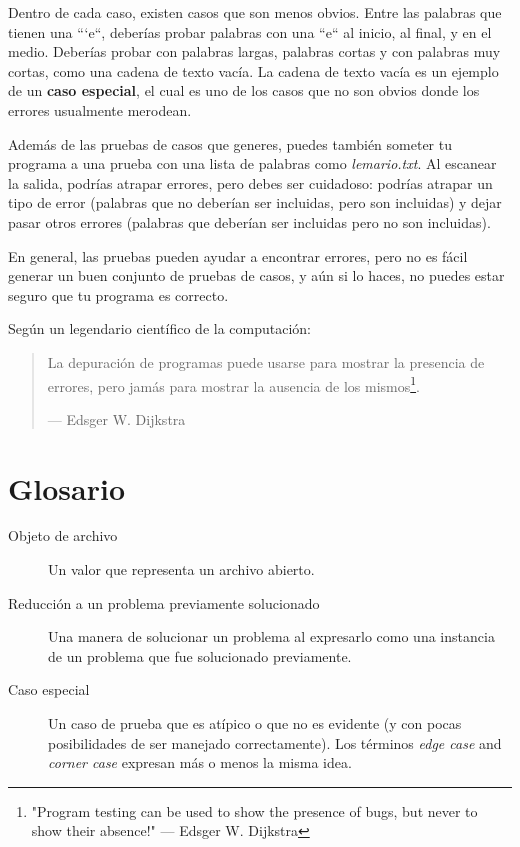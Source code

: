 Dentro de cada caso, existen casos que son menos obvios. Entre las palabras
que tienen una ```e``, deberías probar palabras con una ``e`` al inicio, 
al final, y en el medio. Deberías probar con palabras largas, palabras cortas
y con palabras muy cortas, como una cadena de texto vacía. La cadena de texto 
vacía es un ejemplo de un {\bf caso especial}, el cual es uno de los 
casos que no son obvios donde los errores usualmente merodean.

Además de las pruebas de casos que generes, puedes también someter
tu programa a una prueba con una lista de palabras como \emph{lemario.txt}.
Al escanear la salida, podrías atrapar errores, pero debes ser cuidadoso:
podrías atrapar un tipo de error (palabras que no deberían ser incluidas,
pero son incluidas) y dejar pasar otros errores (palabras que deberían ser
incluidas pero no son incluidas).

En general, las pruebas pueden ayudar a encontrar errores, pero no es fácil
generar un buen conjunto de pruebas de casos, y aún si lo haces, no puedes
estar seguro que tu programa es correcto.

Según un legendario científico de la computación:

\begin{quote}
	
La depuración de programas puede usarse para mostrar la presencia
de errores, pero jamás para mostrar la ausencia de los mismos\footnote{
"Program testing can be used to show the presence of bugs, 
but never to show their absence!" --- Edsger W. Dijkstra
}.

--- Edsger W. Dijkstra
\end{quote}


\section{Glosario}

\begin{description}

\item[Objeto de archivo] Un valor que representa un archivo abierto.

\item[Reducción a un problema previamente solucionado] Una manera de 
solucionar un problema al expresarlo como una instancia de un problema
que fue solucionado previamente.

\item[Caso especial] Un caso de prueba que es atípico o que no es evidente
(y con pocas posibilidades de ser manejado correctamente). Los términos
\emph{edge case} and \emph{corner case} expresan más o menos la misma
idea.

\end{description}


